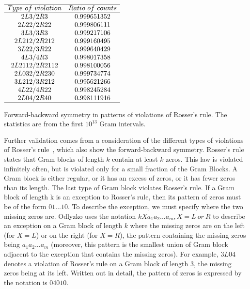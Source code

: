 \documentclass[twoside]{article}
\begin{document}
  
\begin{table}
\centering \(\begin{array}{cc}
\hline
Type~of~violation &Ratio~of~counts\\
\hline
2L3/2R3 &0.999651352\\
2L22/2R22 &0.999806111\\
3L3/3R3 &0.999217106\\
2L212/2R212 &0.999160495\\
3L22/3R22 &0.999640429\\
4L3/4R3 &0.998017358\\
2L2112/2R2112 &0.998100056\\
2L032/2R230 &0.999734774\\
3L212/3R212 &0.995621266\\
4L22/4R22 &0.998245284\\
2L04/2R40 &0.998111916\\
\hline
\end{array}\)
\caption{Forward-backward symmetry in patterns of violations of Rosser's rule.  The statistics are from the first $10^{13}$ Gram intervals.} \label{tab:vrr}
\end{table}

Further validation comes from a consideration of the different types of violations of Rosser's rule~\cite{gourdon}, which also show the forward-backward symmetry. Rosser's rule states that Gram blocks of length $k$ contain at least $k$ zeros. This law is violated infinitely often, but is violated only for a small fraction of the Gram Blocks. A Gram block is either regular, or it has an excess of zeros, or it has fewer zeros than its length. The last type of Gram block violates Rosser's rule. 
If a Gram block of length k is an exception to Rosser's rule, then its pattern of zeros must be of the form $01...10$. To describe the exception, we must specify where the two missing zeros are. Odlyzko uses the notation $kXa_1a_2 . . . a_m, X = L~or~R $ 
to describe an exception on a Gram block of length $k$  where the missing zeros are on the left (for $X = L$) or on the right (for $X = R$), the pattern containing the missing zeros being $a_1a_2 . . . a_m$ (moreover, this pattern is the smallest union of Gram block adjacent to the exception that contains the missing zeros). For example, $3L04$ denotes a violation of Rosser's rule on a Gram block of length 3, the missing zeros being at its left. Written out in detail, the pattern of zeros is expressed by the notation is $04010$.
\end{document}
